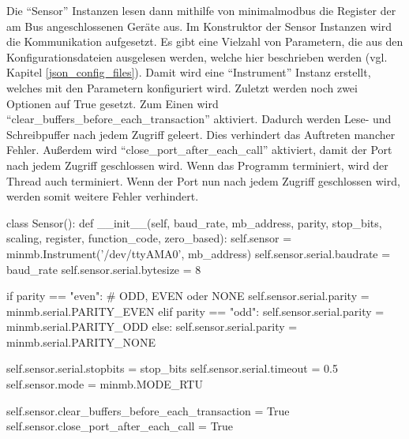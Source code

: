 Die \enquote{Sensor} Instanzen lesen dann mithilfe von minimalmodbus die Register der am Bus angeschlossenen Geräte aus. Im Konstruktor der Sensor Instanzen wird die Kommunikation aufgesetzt. Es gibt eine Vielzahl von Parametern, die aus den Konfigurationsdateien ausgelesen werden, welche hier beschrieben werden (vgl. Kapitel \ref{json_config_files}). Damit wird eine \enquote{Instrument} Instanz erstellt, welches mit den Parametern konfiguriert wird. Zuletzt werden noch zwei Optionen auf True gesetzt. Zum Einen wird \enquote{clear\_buffers\_before\_each\_transaction} aktiviert. Dadurch werden Lese- und Schreibpuffer nach jedem Zugriff geleert. Dies verhindert das Auftreten mancher Fehler. Außerdem wird \enquote{close\_port\_after\_each\_call} aktiviert, damit der Port nach jedem Zugriff geschlossen wird. Wenn das Programm terminiert, wird der Thread auch terminiert. Wenn der Port nun nach jedem Zugriff geschlossen wird, werden somit weitere Fehler verhindert.

\begin{pythoncode}
class Sensor():
	def __init__(self, baud_rate, mb_address, parity, stop_bits, scaling, register, function_code, zero_based):
		self.sensor = minmb.Instrument('/dev/ttyAMA0', mb_address)
		self.sensor.serial.baudrate = baud_rate
		self.sensor.serial.bytesize = 8
		
		if parity == "even":  # ODD, EVEN oder NONE
			self.sensor.serial.parity = minmb.serial.PARITY_EVEN
		elif parity == "odd":
			self.sensor.serial.parity = minmb.serial.PARITY_ODD
		else:
			self.sensor.serial.parity = minmb.serial.PARITY_NONE
		
		self.sensor.serial.stopbits = stop_bits
		self.sensor.serial.timeout = 0.5
		self.sensor.mode = minmb.MODE_RTU
		
		self.sensor.clear_buffers_before_each_transaction = True
		self.sensor.close_port_after_each_call = True
\end{pythoncode}

